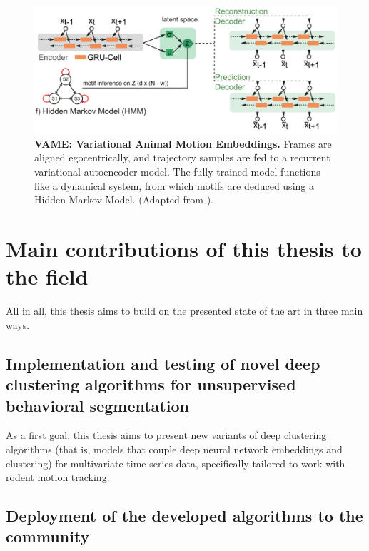 \begin{figure}[H]
\centering
\includegraphics[width=\textwidth]{Figures/sota_10.pdf}

\caption[\textbf{VAME: Variational Animal Motion Embeddings}]{\textbf{VAME: Variational Animal Motion Embeddings.} Frames are aligned egocentrically, and trajectory samples are fed to a
recurrent variational autoencoder model. The fully trained model functions like a dynamical system, from which motifs are deduced using a Hidden-Markov-Model. (Adapted from \cite{Luxem2022IdentifyingMotion}).}
\label{fig:2.10}

\end{figure}

\clearpage

\section{Main contributions of this thesis to the field}

All in all, this thesis aims to build on the presented state of the art in three main ways.

\subsection{Implementation and testing of novel deep clustering algorithms for unsupervised behavioral segmentation}

As a first goal, this thesis aims to present new variants of deep clustering algorithms (that is, models that couple deep neural network embeddings and clustering) for multivariate time series data, specifically tailored to work with rodent motion tracking. %

\subsection{Deployment of the developed algorithms to the community}

